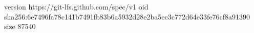 version https://git-lfs.github.com/spec/v1
oid sha256:6e7496fa78c141b7491fb83b6a5932d28e2ba5ec3c772d64e33fe76cf8a91390
size 87540
